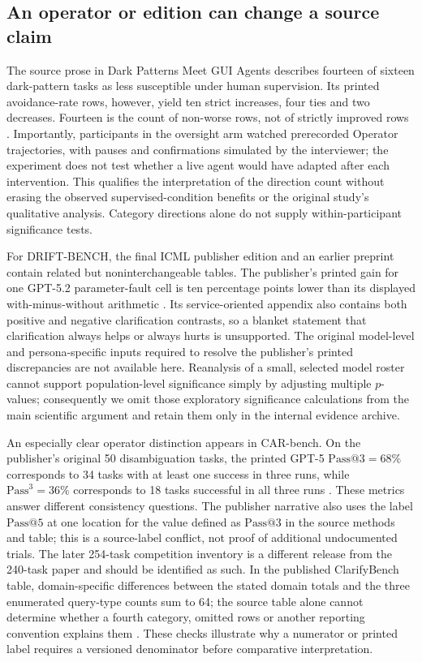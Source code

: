 \subsection{An operator or edition can change a source claim}
The source prose in Dark Patterns Meet GUI Agents describes fourteen of sixteen dark-pattern tasks as less susceptible under human supervision. Its printed avoidance-rate rows, however, yield ten strict increases, four ties and two decreases. Fourteen is the count of non-worse rows, not of strictly improved rows \cite{ref22}. Importantly, participants in the oversight arm watched prerecorded Operator trajectories, with pauses and confirmations simulated by the interviewer; the experiment does not test whether a live agent would have adapted after each intervention. This qualifies the interpretation of the direction count without erasing the observed supervised-condition benefits or the original study's qualitative analysis. Category directions alone do not supply within-participant significance tests.

For DRIFT-BENCH, the final ICML publisher edition and an earlier preprint contain related but noninterchangeable tables. The publisher's printed gain for one GPT-5.2 parameter-fault cell is ten percentage points lower than its displayed with-minus-without arithmetic \cite{ref28}. Its service-oriented appendix also contains both positive and negative clarification contrasts, so a blanket statement that clarification always helps or always hurts is unsupported. The original model-level and persona-specific inputs required to resolve the publisher's printed discrepancies are not available here. Reanalysis of a small, selected model roster cannot support population-level significance simply by adjusting multiple $p$-values; consequently we omit those exploratory significance calculations from the main scientific argument and retain them only in the internal evidence archive.

An especially clear operator distinction appears in CAR-bench. On the publisher's original 50 disambiguation tasks, the printed GPT-5 \(\mathrm{Pass@3}=68\%\) corresponds to 34 tasks with at least one success in three runs, while \(\mathrm{Pass}^{3}=36\%\) corresponds to 18 tasks successful in all three runs \cite{ref40}. These metrics answer different consistency questions. The publisher narrative also uses the label \(\mathrm{Pass@5}\) at one location for the value defined as \(\mathrm{Pass@3}\) in the source methods and table; this is a source-label conflict, not proof of additional undocumented trials. The later 254-task competition inventory is a different release from the 240-task paper and should be identified as such. In the published ClarifyBench table, domain-specific differences between the stated domain totals and the three enumerated query-type counts sum to 64; the source table alone cannot determine whether a fourth category, omitted rows or another reporting convention explains them \cite{ref41}. These checks illustrate why a numerator or printed label requires a versioned denominator before comparative interpretation.


